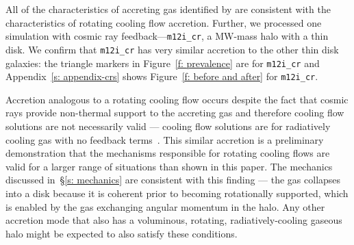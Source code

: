 \documentclass[fleqn,usenatbib]{mnras}
\begin{document}
All of the characteristics of accreting gas identified by \citeauthor{Trapp2021} are consistent with the characteristics of rotating cooling flow accretion.
Further, we processed one simulation with cosmic ray feedback---\texttt{m12i\_cr}, a MW-mass halo with a thin disk.
We confirm that \texttt{m12i\_cr} has very similar accretion to the other thin disk galaxies:
the triangle markers in Figure~\ref{f: prevalence} are for \texttt{m12i\_cr} and Appendix~\ref{s: appendix-crs} shows Figure~\ref{f: before and after} for \texttt{m12i\_cr}.

Accretion analogous to a rotating cooling flow occurs despite the fact that cosmic rays provide non-thermal support to the accreting gas and therefore cooling flow solutions are not necessarily valid --- cooling flow solutions are for radiatively cooling gas with no feedback terms~\citep[e.g.][]{Stern2019}.
This similar accretion is a preliminary demonstration that the mechanisms responsible for rotating cooling flows are valid for a larger range of situations than shown in this paper.
The mechanics discussed in~\S\ref{s: mechanics} are consistent with this finding ---
the gas collapses into a disk because it is coherent prior to becoming rotationally supported, which is enabled by the gas exchanging angular momentum in the halo.
Any other accretion mode that also has a voluminous, rotating, radiatively-cooling gaseous halo might be expected to also satisfy these conditions.


\end{document}
